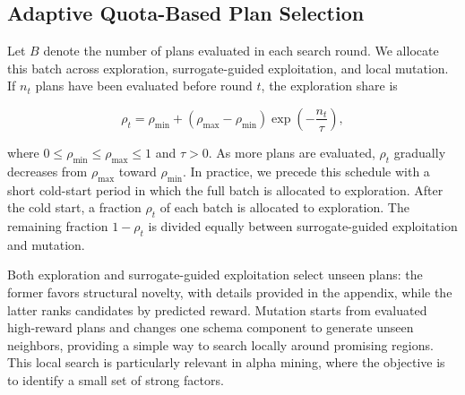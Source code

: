 \subsection{Adaptive Quota-Based Plan Selection}

Let \(B\) denote the number of plans evaluated in each search round. We
allocate this batch across exploration, surrogate-guided exploitation,
and local mutation. If \(n_t\) plans have been evaluated before round
\(t\), the exploration share is

\[
\rho_t
=
\rho_{\min}
+
(\rho_{\max}-\rho_{\min})
\exp\!\left(-\frac{n_t}{\tau}\right),
\]

where \(0 \leq \rho_{\min} \leq \rho_{\max} \leq 1\) and \(\tau>0\).
As more plans are evaluated, \(\rho_t\) gradually decreases from
\(\rho_{\max}\) toward \(\rho_{\min}\). In practice, we precede this
schedule with a short cold-start period in which the full batch is
allocated to exploration. After the cold start, a fraction \(\rho_t\) of each batch
is allocated to exploration. The remaining fraction \(1-\rho_t\) is
divided equally between surrogate-guided exploitation and mutation.

Both exploration and surrogate-guided exploitation select unseen plans:
the former favors structural novelty, with details provided in the
appendix, while the latter ranks candidates by predicted reward.
Mutation starts from evaluated high-reward plans and changes one schema
component to generate unseen neighbors, providing a simple way to search
locally around promising regions. This local search is particularly relevant in alpha mining, where the
objective is to identify a small set of strong factors.